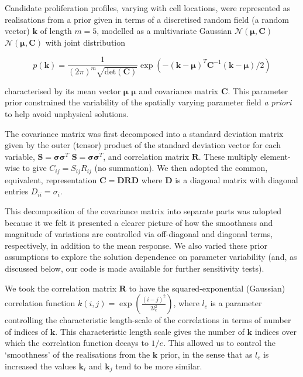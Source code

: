 \documentclass[10pt,letterpaper]{article}
\providecommand{\DIFaddtex}[1]{{\protect\color{blue} \sf #1}} %
\providecommand{\DIFdeltex}[1]{{\protect\color{red} \scriptsize #1}} %
\providecommand{\DIFaddbegin}{} %
\providecommand{\DIFaddend}{} %
\providecommand{\DIFdelbegin}{} %
\providecommand{\DIFdelend}{} %
\providecommand{\DIFadd}[1]{\texorpdfstring{\DIFaddtex{#1}}{#1}} %
\providecommand{\DIFdel}[1]{\texorpdfstring{\DIFdeltex{#1}}{}} %
\begin{document}
Candidate proliferation profiles, varying with cell locations, were
represented as realisations from a prior given in terms of a discretised
random field (a random vector) \(\mathbf{k}\) of length \(m=5\),
modelled as a multivariate Gaussian
\DIFdelbegin \DIFdel{\(\mathcal{N}(\symbf{\mu},\mathbf{C})\) }\DIFdelend \DIFaddbegin \DIFadd{\(\mathcal{N}(\boldsymbol{\mu},\mathbf{C})\) }\DIFaddend with joint distribution

\begin{equation}p(\mathbf{k}) = \frac{1}{(2\pi)^m\sqrt{\mbox{det}(\mathbf{C})}}\exp(-(\mathbf{k}-\DIFdelbegin %
\DIFdelend \DIFaddbegin \boldsymbol{\mu}\DIFaddend )^T\mathbf{C}^{-1}(\mathbf{k}-\DIFdelbegin %
\DIFdelend \DIFaddbegin \boldsymbol{\mu}\DIFaddend )/2)\label{eq:prior}\end{equation}

characterised by its mean vector \DIFdelbegin \DIFdel{\(\symbf{\mu}\) }\DIFdelend \DIFaddbegin \DIFadd{\(\boldsymbol{\mu}\) }\DIFaddend and covariance
matrix \(\mathbf{C}\). This parameter prior constrained the variability
of the spatially varying parameter field \emph{a priori} to help avoid
unphysical solutions.

The covariance matrix was first decomposed into a standard deviation
matrix given by the outer (tensor) product of the standard deviation
vector for each variable,
\DIFdelbegin \DIFdel{\(\mathbf{S} = \symbf{\sigma}\symbf{\sigma}^T\)}\DIFdelend \DIFaddbegin \DIFadd{\(\mathbf{S} = \boldsymbol{\sigma}\boldsymbol{\sigma}^T\)}\DIFaddend , and
correlation matrix \(\mathbf{R}\). These multiply element-wise to give
\(C_{ij} = S_{ij}R_{ij}\) (no summation). We then adopted the common,
equivalent, representation
\(\mathbf{C} = \mathbf{D}\mathbf{R}\mathbf{D}\) where \(\mathbf{D}\) is
a diagonal matrix with diagonal entries \(D_{ii} = \sigma_i\).

\DIFdelbegin \DIFdel{This decomposition of the covariance matrix into separate parts was
adopted because it we felt it presented a clearer picture of how the
smoothness and magnitude of variations are controlled via off-diagonal
and diagonal terms, respectively, in addition to the mean response. We also varied these prior assumptions to explore the solution dependence
on parameter variability (and, as discussed below, our code is made
available for further sensitivity tests).
}%

\DIFdelend We took the correlation matrix \(\mathbf{R}\) to have the
squared-exponential (Gaussian) correlation function
\(k(i,j) = \exp(\frac{(i-j)^2}{2l_c^2})\), where \(l_c\) is a parameter
controlling the characteristic length-scale of the correlations in terms
of number of indices of \(\mathbf{k}\). This characteristic length scale
gives the number of \(\mathbf{k}\) indices over which the correlation
function decays to \(1/e\). This allowed us to control the `smoothness'
of the realisations from the \(\mathbf{k}\) prior, in the sense that as
\(l_c\) is increased the values \(\mathbf{k}_i\) and \(\mathbf{k}_j\)
tend to be more similar.
\end{document}
